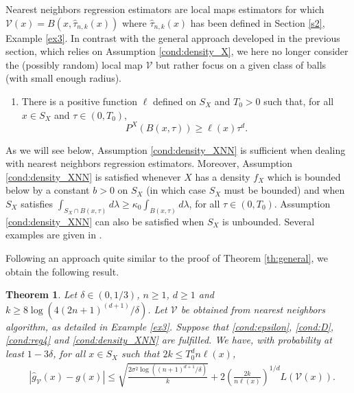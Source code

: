 \documentclass[paper=a4, fontsize=11pt]{scrartcl}
\newtheorem{theorem}{Theorem}
\begin{document}
Nearest neighbors regression estimators are local maps estimators for which
$\mathcal V (x) = B (x, \hat \tau _{n,k}(x) ) $
where $ \hat \tau _{n,k}(x)$ has been defined in Section \ref{s2}, Example \ref{ex3}. In contrast with the general approach developed in the previous section, which relies on Assumption \ref{cond:density_X}, we here no longer consider the (possibly random) local map $\mathcal V$ but rather focus on a given class of balls (with small enough radius).

\begin{enumerate}[label=(XNN), wide=0.5em,  leftmargin=*]
\item  \label{cond:density_XNN} %
There is a positive function $\ell $ defined on $S_X$ and $T_0>0$ such that, for all $x\in S_X$ and $\tau \in (0, T_0)$,
$$ P^X( B(x, \tau) )  \geq   \ell(x)\tau ^d.$$
\end{enumerate}

  As we will see below, Assumption \ref{cond:density_XNN} is sufficient when dealing with nearest neighbors regression estimators. Moreover, Assumption \ref{cond:density_XNN} is satisfied whenever $X$ has a density $f_X$ which is bounded below by a constant $b> 0$ on $S_X$ (in which case $S_X$ must be bounded) and when $S_X$ satisfies $ \int _{S_X \cap B(x,\tau )} d\lambda \geq \kappa_0 \int _{B(x,\tau )} d\lambda$, %
  for all $\tau \in (0, T_0)$. Assumption \ref{cond:density_XNN} can also be satisfied when $S_X$ is unbounded. Several examples are given in  \cite{gadat2016classification}. 

Following an approach quite similar to the proof of Theorem \ref{th:general}, we obtain the following result. 





\begin{theorem}\label{th:NN}
Let $\delta \in (0,1/3) $, $n\geq 1$, $d\geq 1$ and $k\geq  8    \log( 4 (2n+1) ^{(d+1) } / \delta ) $.  Let $\mathcal V $ be obtained from nearest neighbors algorithm, as detailed in Example \ref{ex3}. Suppose that \ref{cond:epsilon}, \ref{cond:D}, \ref{cond:reg4} and  \ref{cond:density_XNN} are fulfilled. We have, with probability at least $1-3\delta$, for all $x\in S_X$ such that $2 k \leq   T_0^d n \ell(x)$,
\begin{align*}
    &|\hat g_{\mathcal V} (x) - g(x) | \leq  \sqrt{\frac{2\sigma^2\log ( {(n+1)^{d+1}/\delta })  }{ k }} + 2 \left(\frac{ 2 k   }{  n \ell(x)  }   \right)^{1/d} L(\mathcal{V}(x)).
\end{align*}
\end{theorem}
\end{document}
